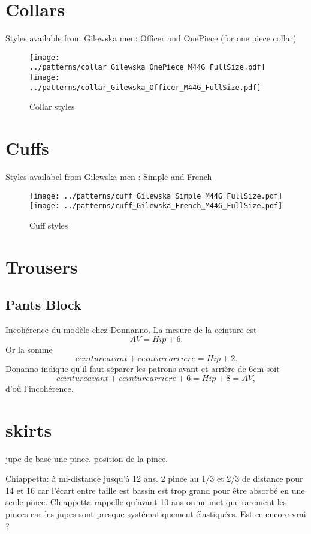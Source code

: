 \documentclass[10pt,a4paper,twoside]{report}
\begin{document}
\section{Collars}
Styles available from Gilewska men: Officer and OnePiece (for one piece collar)

\begin{figure}
\begin{center}
\texttt{[image: ../patterns/collar\_Gilewska\_OnePiece\_M44G\_FullSize.pdf]}
\texttt{[image: ../patterns/collar\_Gilewska\_Officer\_M44G\_FullSize.pdf]}
\end{center}
\caption{Collar styles}
\end{figure}


\section{Cuffs}
Styles availabel from Gilewska men : Simple and French

\begin{figure}
\begin{center}
\texttt{[image: ../patterns/cuff\_Gilewska\_Simple\_M44G\_FullSize.pdf]}
\texttt{[image: ../patterns/cuff\_Gilewska\_French\_M44G\_FullSize.pdf]}
\end{center}
\caption{Cuff styles}
\end{figure}

\section{Trousers}


\subsection{Pants Block}

Incohérence du modèle chez Donnanno. La mesure de la ceinture est
$$AV = Hip + 6.$$
Or la somme
$$ceinture avant + ceinture arriere = Hip +2.$$
Donanno indique qu'il faut séparer les patrons avant et arrière de 6cm soit
$$ceinture avant + ceinture arriere + 6 = Hip +8 = AV,$$
d'où l'incohérence.

\section{skirts}

jupe de base une pince. position de la pince.

Chiappetta: à mi-distance jusqu'à 12 ans. 2 pince au 1/3 et 2/3 de distance pour 14 et 16 car l'écart entre taille est bassin est trop grand pour être absorbé en une seule pince. Chiappetta rappelle qu'avant 10 ans on ne met que rarement les pinces car les jupes sont presque systématiquement élastiquées. Est-ce encore vrai ?
\end{document}
